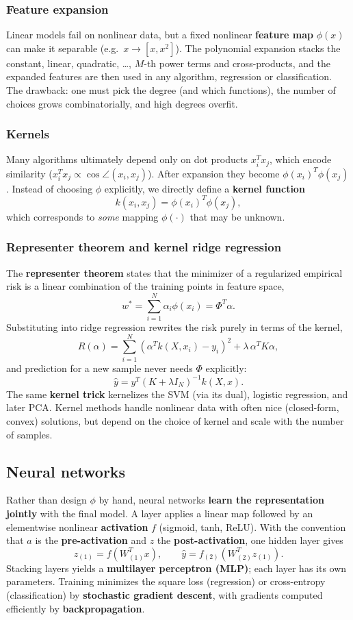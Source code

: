 \subsubsection{Feature expansion}
Linear models fail on nonlinear data, but a fixed nonlinear \textbf{feature map}
$\phi(x)$ can make it separable (e.g.\ $x \to [x, x^2]$). The polynomial
expansion stacks the constant, linear, quadratic, \dots, $M$-th power terms and
cross-products, and the expanded features are then used in any algorithm,
regression or classification. The drawback: one must pick the degree (and which
functions), the number of choices grows combinatorially, and high degrees
overfit.

\subsubsection{Kernels}
Many algorithms ultimately depend only on dot products $x_i^T x_j$, which encode
similarity ($x_i^T x_j \propto \cos\angle(x_i,x_j)$). After expansion they become
$\phi(x_i)^T \phi(x_j)$. Instead of choosing $\phi$ explicitly, we directly
define a \textbf{kernel function}
\[
  k(x_i, x_j) = \phi(x_i)^T \phi(x_j) ,
\]
which corresponds to \textit{some} mapping $\phi(\cdot)$ that may be unknown.

\subsubsection{Representer theorem and kernel ridge regression}
The \textbf{representer theorem} states that the minimizer of a regularized
empirical risk is a linear combination of the training points in feature space,
\[
  w^* = \sum_{i=1}^{N} \alpha_i \phi(x_i) = \Phi^T \alpha .
\]
Substituting into ridge regression rewrites the risk purely in terms of the
kernel,
\[
  R(\alpha) = \sum_{i=1}^{N} \left(\alpha^T k(X, x_i) - y_i\right)^2
  + \lambda\, \alpha^T K \alpha ,
\]
and prediction for a new sample never needs $\Phi$ explicitly:
\[
  \hat{y} = y^T (K + \lambda I_N)^{-1} k(X, x) .
\]
The same \textbf{kernel trick} kernelizes the SVM (via its dual), logistic
regression, and later PCA. Kernel methods handle nonlinear data with often nice
(closed-form, convex) solutions, but depend on the choice of kernel and scale
with the number of samples.

\subsection{Neural networks}
Rather than design $\phi$ by hand, neural networks \textbf{learn the
representation jointly} with the final model. A layer applies a linear map
followed by an elementwise nonlinear \textbf{activation} $f$ (sigmoid, tanh,
ReLU). With the convention that $a$ is the \textbf{pre-activation} and $z$ the
\textbf{post-activation}, one hidden layer gives
\[
  z_{(1)} = f\!\left(W_{(1)}^T x\right), \qquad
  \hat{y} = f_{(2)}\!\left(W_{(2)}^T z_{(1)}\right) .
\]
Stacking layers yields a \textbf{multilayer perceptron (MLP)}; each layer has its
own parameters. Training minimizes the square loss (regression) or cross-entropy
(classification) by \textbf{stochastic gradient descent}, with gradients
computed efficiently by \textbf{backpropagation}.

